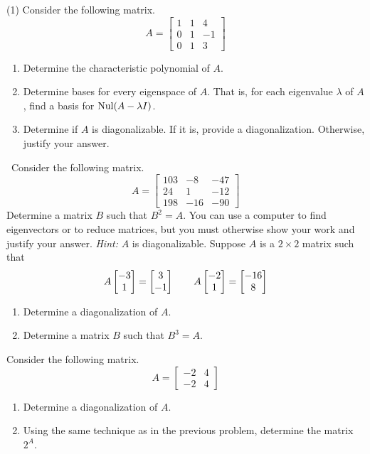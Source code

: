 \begin{tasks}[resume, style=enumerate](1)
\task
  Consider the following matrix.
  \begin{displaymath}
    A =
    \begin{bmatrix}
      1 & 1 & 4 \\
      0 & 1 & -1 \\
      0 & 1 & 3
    \end{bmatrix}
  \end{displaymath}
  \begin{enumerate}[label=(\alph*)]
  \item
    Determine the characteristic polynomial of $A$.
  \item
    Determine bases for every eigenspace of $A$. That is, for
    each eigenvalue $\lambda$ of $A$, find a basis for $\operatorname{\mathrm{Nul}}(A - \lambda
    I)$.
  \item
    Determine if $A$ is diagonalizable. If it is, provide a
    diagonalization. Otherwise, justify your answer.
  \end{enumerate}
\task \faCalculator \
  Consider the following matrix.
  \begin{displaymath}
    A =
    \begin{bmatrix}
      103 & -8 & -47 \\
      24 & 1 & -12 \\
      198 & -16 & -90
    \end{bmatrix}
  \end{displaymath}
  Determine a matrix $B$ such that $B^2 = A$. You can use a computer
  to find eigenvectors or to reduce matrices, but you must otherwise
  show your work and justify your answer.  \textit{Hint:} $A$ is
  diagonalizable.
\task
  Suppose $A$ is a $2 \times 2$ matrix such that
  \begin{displaymath}
    A  \begin{bmatrix} -3 \\ 1 \end{bmatrix}  =  \begin{bmatrix} 3 \\ -1 \end{bmatrix} 
    \qquad
    A  \begin{bmatrix} -2 \\ 1 \end{bmatrix}  =  \begin{bmatrix} -16 \\ 8 \end{bmatrix} 
  \end{displaymath}
  \begin{enumerate}[label=(\alph*)]
  \item
    Determine a diagonalization of $A$.
  \item
    Determine a matrix $B$ such that $B^3 = A$.
  \end{enumerate}
\task
  Consider the following matrix.
  \begin{displaymath}
    A =
    \begin{bmatrix}
      -2 & 4\\
      -2 & 4
    \end{bmatrix}
  \end{displaymath}
  \begin{enumerate}[label=(\alph*)]
  \item
    Determine a diagonalization of $A$.
  \item
    Using the same technique as in the previous problem, determine the
    matrix $2^A$.
  \end{enumerate}
\end{tasks}


